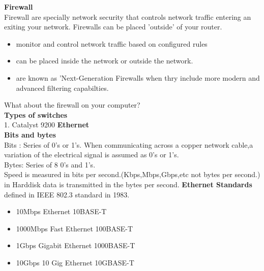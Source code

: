 \documentclass{report}
\begin{document}
	\textbf{Firewall}\\ Firewall are specially network security that controls
	network traffic entering an exiting your network. Firewalls can be placed 'outside'
	of your router.\\
	\begin{itemize}
		\item monitor and control network traffic based on configured rules

		\item can be placed inside the network or outside the network.

		\item are known as 'Next-Generation Firewalls when thry include more modern
			and advanced filtering capabilties.
	\end{itemize}
	What about the firewall on your computer?\\
	\textbf{Types of switches}\\ 1. Catalyst 9200 
	\textbf{Ethernet}\\ \textbf{Bits and bytes}\\ Bits : Series of 0's or 1's. When
	communicating across a copper network cable,a variation of the electrical signal
	is assumed as 0's or 1's. \\ Bytes: Series of 8 0's and 1's. \\ Speed is
	measured in bits per second.(Kbps,Mbps,Gbps,etc not bytes per second.) in Harddisk
	data is transmitted in the bytes per second. \textbf{Ethernet Standards}\\
	defined in IEEE 802.3 standard in 1983.
	\begin{itemize}
		\item 10Mbps Ethernet 10BASE-T\\

		\item 1000Mbps Fast Ethernet 100BASE-T\\

		\item 1Gbps Gigabit Ethernet 1000BASE-T\\

		\item 10Gbps 10 Gig Ethernet 10GBASE-T\\
	\end{itemize}
\end{document}
